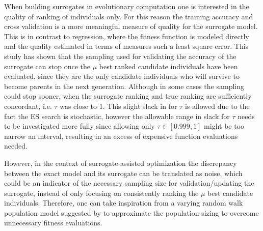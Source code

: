 \documentclass[10pt, conference]{IEEEtran} %
\begin{document}
When building surrogates in evolutionary computation one is interested in the quality of ranking of individuals  only. For this reason the training accuracy and cross validation is a more meaningful measure of quality for the surrogate model. This is in contrast to regression, where the fitness function is modeled directly and the quality estimated in terms of measures such a least square error. 
This study has shown that the sampling used for validating the accuracy of the surrogate can stop once the $\mu$ best ranked candidate individuals have been evaluated, since they are the only candidate individuals who will survive to become parents in the next generation. 
Although in some cases the sampling could stop sooner, when the surrogate ranking and true ranking are sufficiently concordant, i.e. $\tau$ was close to 1. This slight slack in for $\tau$ is allowed due to the fact the ES search is stochastic, however the allowable range in slack for $\tau$ needs to be investigated more fully %
since allowing only $\tau\in[0.999,1]$ might be too narrow an interval, resulting in an excess of expensive function evaluations needed. %

However, in the context of surrogate-assisted optimization the discrepancy between the exact model and its surrogate can be translated as noise, which could be an indicator of the necessary sampling size for validation/updating the surrogate, instead of only focusing on consistently ranking the $\mu$ best candidate individuals. Therefore, one can take inspiration from a varying random walk population model suggested by \cite{Miller1997} to approximate the population sizing to overcome unnecessary fitness evaluations.








%


\end{document}
